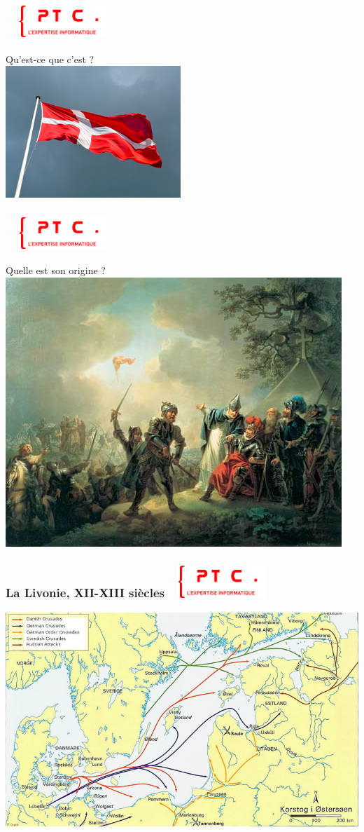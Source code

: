 \documentclass[11pt]{beamer}
\newenvironment{slide}[1]{%
\begin{frame}[environment=slide]
\frametitle{#1~\hfill~\includegraphics[height=1.2cm]{./epitech.png}}
}{%
\end{frame}
}
\begin{document}
\begin{slide}{}
	Qu'est-ce que c'est ?\\ \vspace{0.2cm}
	\includegraphics[scale=1]{danish_flag.png}
\end{slide}

\begin{slide}{}
	Quelle est son origine ?\\ \vspace{0.2cm}
	\includegraphics[scale=2.5]{Anders_Sunesen.jpg}
\end{slide}

\begin{slide}{La Livonie, XII-XIII\up{e} siècles}
\begin{center}
\includegraphics[scale=0.37]{crusades.jpg}
\end{center}
\end{slide}
\end{document}
